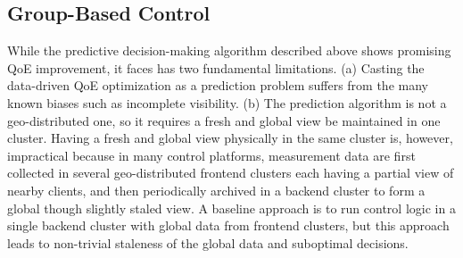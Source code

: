 %


\subsection{Group-Based Control}
\label{subsec:overview:group}

While the predictive decision-making algorithm 
described above shows promising QoE improvement, 
it faces has two fundamental limitations.
(a) Casting the data-driven QoE optimization as a
prediction problem suffers from the many known 
biases such as incomplete visibility.
(b) The prediction algorithm is not a geo-distributed one, 
so it requires a fresh and global view be maintained in
one cluster. Having a fresh and global view 
physically in the same cluster is, however, impractical 
because in many control platforms, measurement 
data are first collected in several geo-distributed frontend 
clusters each having a partial view of nearby clients,
and then periodically archived in a backend cluster
to form a global though slightly staled view.
A baseline approach is to run control logic in a 
single backend cluster with global data from frontend 
clusters, but this approach leads to non-trivial 
staleness of the global data and suboptimal decisions.


